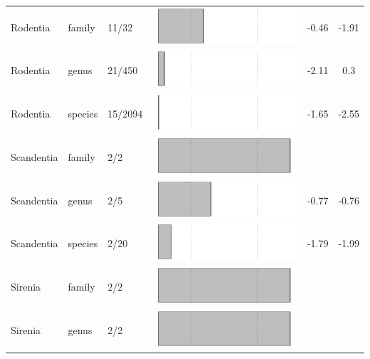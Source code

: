 \begin{longtable}{lL{1.8cm}C{2cm}ccc}
  Rodentia & family & 11/32 & \includegraphics[width=0.20\linewidth, height=0.05\linewidth]{Missing_mammals/Table_figures/bar70.pdf} & -0.46 & -1.91 \\ 
  Rodentia & genus & 21/450 & \includegraphics[width=0.20\linewidth, height=0.05\linewidth]{Missing_mammals/Table_figures/bar71.pdf} & -2.11 & 0.3 \\ 
  Rodentia & species & 15/2094 & \includegraphics[width=0.20\linewidth, height=0.05\linewidth]{Missing_mammals/Table_figures/bar72.pdf} & -1.65 & -2.55 \\ 
  Scandentia & family & 2/2 & \includegraphics[width=0.20\linewidth, height=0.05\linewidth]{Missing_mammals/Table_figures/bar73.pdf} &   &   \\ 
  Scandentia & genus & 2/5 & \includegraphics[width=0.20\linewidth, height=0.05\linewidth]{Missing_mammals/Table_figures/bar74.pdf} & -0.77 & -0.76 \\ 
  Scandentia & species & 2/20 & \includegraphics[width=0.20\linewidth, height=0.05\linewidth]{Missing_mammals/Table_figures/bar75.pdf} & -1.79 & -1.99 \\ 
  Sirenia & family & 2/2 & \includegraphics[width=0.20\linewidth, height=0.05\linewidth]{Missing_mammals/Table_figures/bar76.pdf} &   &   \\ 
  Sirenia & genus & 2/2 & \includegraphics[width=0.20\linewidth, height=0.05\linewidth]{Missing_mammals/Table_figures/bar77.pdf} &   &   \\ 

\end{longtable}
